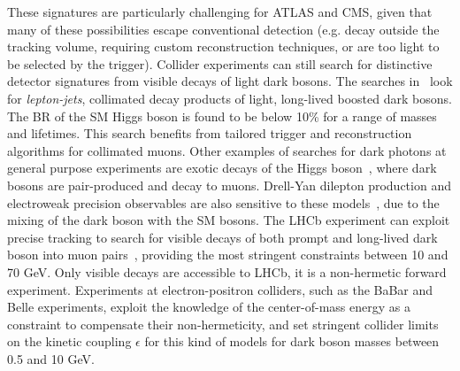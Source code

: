 These signatures are particularly challenging for ATLAS and CMS, given that many of these possibilities escape
conventional detection (e.g. decay outside the tracking volume, requiring custom reconstruction techniques, or 
are too light to be selected by the trigger). 
Collider experiments can still search for distinctive detector signatures from visible decays of light dark bosons. 
The searches in~\cite{ATLAS:2016jza} look for \textit{lepton-jets}, collimated decay products of light,
long-lived boosted dark bosons.
The BR of the SM Higgs boson is found to be below 10\% for a range of masses and lifetimes. This search benefits from tailored
trigger and reconstruction algorithms for collimated muons. Other examples of searches for dark photons at
general purpose experiments are exotic decays of the Higgs boson~\cite{Aad:2015sva.CMS-PAS-HIG-16-035}, 
where dark bosons are pair-produced and decay to muons. 
Drell-Yan dilepton production
and electroweak precision observables are also sensitive to these models~\cite{Curtin:2014cca},
due to the mixing of the dark boson with the SM bosons. 
The LHCb experiment can exploit precise tracking 
to search for visible decays of both prompt and long-lived dark boson into muon pairs~\cite{Aaij:2017rft},
providing the most stringent constraints between 10 and 70 GeV. 
Only visible decays are accessible to LHCb,
it is a non-hermetic forward experiment. 
Experiments at electron-positron colliders, such as the BaBar and Belle experiments, 
exploit the knowledge of the center-of-mass energy as a constraint to compensate their non-hermeticity, 
and set stringent collider limits on the kinetic coupling $\epsilon$ for this kind of models
for dark boson masses between 0.5 and 10 GeV. 



%
%
%
%
%


